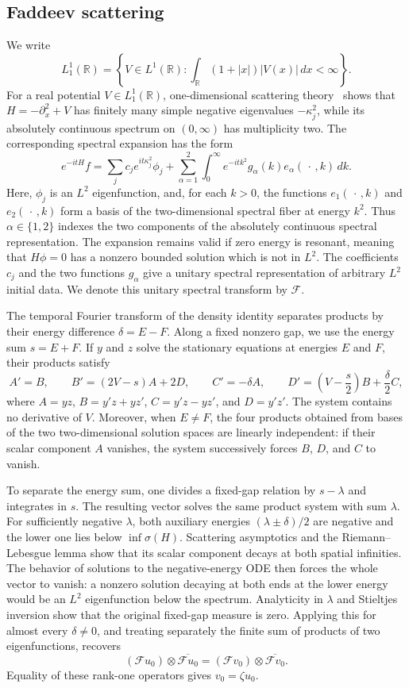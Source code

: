 \documentclass[11pt]{amsart}
\theoremstyle{remark}
\newcommand{\R}{\mathbb R}
\newcommand{\1}{\mathbf 1}
\begin{document}
\subsection{Faddeev scattering}

We write
\[
 L^1_1(\R)=\left\{V\in L^1(\R):\int_\R(1+|x|)|V(x)|\,dx<\infty\right\}.
\]
For a real potential $V\in L^1_1(\R)$, one-dimensional scattering
theory~\cite{DeiftTrubowitz,EgorovaKopylovaMarchenkoTeschl} shows that
$H=-\partial_x^2+V$ has finitely many simple negative eigenvalues
$-\kappa_j^2$, while its absolutely continuous spectrum on $(0,\infty)$
has multiplicity two.  The corresponding spectral expansion has the
form
\[
 e^{-itH}f
 =\sum_j c_j e^{it\kappa_j^2}\phi_j
  +\sum_{\alpha=1}^2\int_0^\infty
    e^{-itk^2}g_\alpha(k)e_\alpha(\,\cdot\,,k)\,dk.
\]
Here, $\phi_j$ is an $L^2$ eigenfunction, and, for each $k>0$, the functions
$e_1(\,\cdot\,,k)$ and $e_2(\,\cdot\,,k)$ form a basis of the
two-dimensional spectral fiber at energy $k^2$.  Thus $\alpha\in\{1,2\}$
indexes the two components of the absolutely continuous spectral
representation.  The expansion remains valid if zero energy is resonant,
meaning that $H\phi=0$ has a nonzero bounded solution which is not in $L^2$.
The coefficients $c_j$ and the two functions $g_\alpha$ give a unitary
spectral representation of arbitrary $L^2$ initial data.  We denote this
unitary spectral transform by $\mathcal F$.

The temporal Fourier transform of the density identity separates products by
their energy difference $\delta=E-F$.  Along a fixed nonzero gap, we use the
energy sum $s=E+F$.  If $y$ and $z$ solve the stationary equations at energies
$E$ and $F$, their products satisfy
\[
 A'=B,\qquad B'=(2V-s)A+2D,\qquad
 C'=-\delta A,\qquad
 D'=\left(V-\frac{s}{2}\right)B+\frac{\delta}{2}C,
\]
where $A=yz$, $B=y'z+yz'$, $C=y'z-yz'$, and $D=y'z'$.  The system contains
no derivative of $V$.  Moreover, when $E\ne F$, the four products obtained
from bases of the two two-dimensional solution spaces are linearly
independent: if their scalar component $A$ vanishes, the system successively
forces $B$, $D$, and $C$ to vanish.

To separate the energy sum, one divides a fixed-gap relation by $s-\lambda$
and integrates in $s$.  The resulting vector solves the same product system
with sum $\lambda$.  For sufficiently negative $\lambda$, both auxiliary
energies $(\lambda\pm\delta)/2$ are negative and the lower one lies below
$\inf\sigma(H)$.  Scattering asymptotics and the Riemann--Lebesgue lemma show
that its scalar component decays at both spatial infinities.  The behavior of
solutions to the negative-energy ODE then forces the whole vector to vanish:
a nonzero solution decaying at both ends at the lower energy would be an
$L^2$ eigenfunction below the spectrum.  Analyticity in $\lambda$ and
Stieltjes inversion show that the original fixed-gap measure is zero.
Applying this for almost every $\delta\ne0$, and treating separately the
finite sum of products of two eigenfunctions, recovers
\[
 (\mathcal F u_0)\otimes\overline{\mathcal F u_0}
 =(\mathcal F v_0)\otimes\overline{\mathcal F v_0}.
\]
Equality of these rank-one operators gives $v_0=\zeta u_0$.
\end{document}
